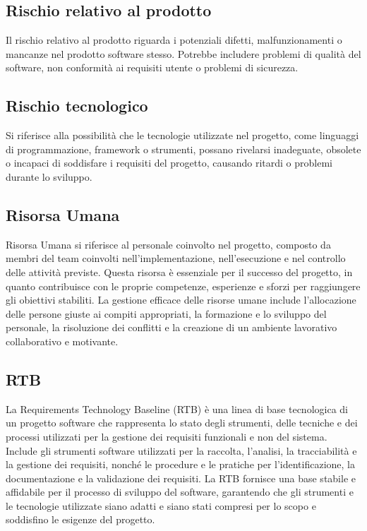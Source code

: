 \subsection*{Rischio relativo al prodotto} 
Il rischio relativo al prodotto riguarda i potenziali difetti, malfunzionamenti o mancanze nel prodotto software stesso. Potrebbe includere problemi di qualità del software, non conformità ai requisiti utente o problemi di sicurezza.
\subsection*{Rischio tecnologico} 
Si riferisce alla possibilità che le tecnologie utilizzate nel progetto, come linguaggi di programmazione, framework o strumenti, possano rivelarsi inadeguate, obsolete o incapaci di soddisfare i requisiti del progetto, causando ritardi o problemi durante lo sviluppo.
\subsection*{Risorsa Umana} 
Risorsa Umana si riferisce al personale coinvolto nel progetto, composto da membri del team coinvolti nell'implementazione, nell'esecuzione e nel controllo delle attività previste. Questa risorsa è essenziale per il successo del progetto, in quanto contribuisce con le proprie competenze, esperienze e sforzi per raggiungere gli obiettivi stabiliti. La gestione efficace delle risorse umane include l'allocazione delle persone giuste ai compiti appropriati, la formazione e lo sviluppo del personale, la risoluzione dei conflitti e la creazione di un ambiente lavorativo collaborativo e motivante. 
\subsection*{RTB} 
La Requirements Technology Baseline (RTB) è una linea di base tecnologica di un progetto software che rappresenta lo stato degli strumenti, delle tecniche e dei processi utilizzati per la gestione dei requisiti funzionali e non del sistema. Include gli strumenti software utilizzati per la raccolta, l'analisi, la tracciabilità e la gestione dei requisiti, nonché le procedure e le pratiche per l'identificazione, la documentazione e la validazione dei requisiti. La RTB fornisce una base stabile e affidabile per il processo di sviluppo del software, garantendo che gli strumenti e le tecnologie utilizzate siano adatti e siano stati compresi per lo scopo e soddisfino le esigenze del progetto.
